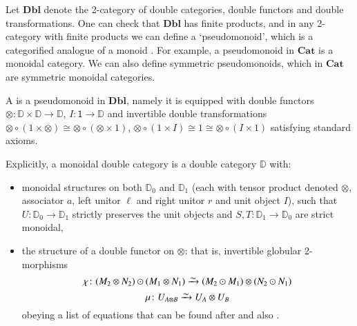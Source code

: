 \documentclass[reqno]{amsart}
\newcommand{\simrightarrow}{\xrightarrow{\raisebox{-3pt}[0pt][0pt]{\ensuremath{\sim}}}}
\let\maps\colon
\theoremstyle{definition}
\theoremstyle{remark}
\newcommand{\one}{\mathsf{1}}
\newcommand{\bicat}{\mathbf}
\newcommand{\Dbl}{\bicat{Dbl}}
\newcommand{\Cat}{\bicat{Cat}}
\newcommand{\double}[1]{\mathbf{\mathbb #1}}
\newcommand{\lD}{\double{D}}
\newcommand{\define}[1]{{\bf \boldmath{#1}}}
\begin{document}
Let $\Dbl$ denote the 2-category of double categories, double functors and double transformations. One can check that $\Dbl$ has finite products, and in any 2-category with finite products we can define a `pseudomonoid', which is a categorified analogue of a monoid \cite{DS}. For example, a pseudomonoid in $\Cat$ is a monoidal category.   We can also define symmetric pseudomonoids, which in $\Cat$ are symmetric monoidal categories.

\begin{defn}
\label{defn:monoidal_double_category}
A \define{monoidal double category} is a pseudomonoid in $\Dbl$, namely it is equipped with double functors $\otimes\maps\lD\times\lD\to\lD$, $I\maps\one\to\lD$ and invertible double transformations $\otimes\circ(1\times\otimes)\cong\otimes\circ(\otimes\times1)$, $\otimes\circ(1\times I)\cong1\cong\otimes\circ(I\times1)$ satisfying standard axioms.
\end{defn} 
\noindent
Explicitly, a monoidal double category is a double category $\lD$ with:
\begin{itemize}
\item monoidal structures on both $\lD_0$ and $\lD_1$ (each with tensor product denoted $\otimes$, associator $a$, left unitor $\ell$ and right unitor $r$ and unit object $I$), such that $U \maps \lD_0 \to \lD_1$ strictly preserves the unit objects and $S,T \maps \lD_1 \to \lD_0$ are strict monoidal,    
\item the structure of a double functor on $\otimes$:
that is, invertible globular 2-morphisms
\[ \chi \maps (M_2\otimes N_2)\odot(M_1\otimes N_1)  \simrightarrow
(M_2\odot M_1)\otimes (N_2\odot N_1)\]
\[ \mu \maps U_{A\otimes B} \simrightarrow U_A \otimes U_B\]
obeying a list of equations that can be found after \cite[Definition 2.10]{HS} and also \cite[Definition A.5]{BC}.
\end{itemize}
\end{document}
